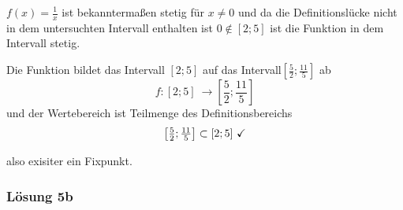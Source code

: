 \documentclass[main.tex]{subfiles}
\begin{document}
$f(x) =\frac{1}{x}$ ist bekanntermaßen stetig für $x\neq 0$ und da die Definitionslücke nicht in dem untersuchten Intervall enthalten ist $0\notin [ 2;5]$ ist die Funktion in dem Intervall stetig.

Die Funktion bildet das Intervall $\displaystyle {\textstyle [ 2;5]}$ auf das Intervall${\textstyle \left[\frac{5}{2} ;\frac{11}{5}\right]}$ ab 
\begin{equation*}
    {\textstyle f:[ 2;5] \ \rightarrow \left[\frac{5}{2} ;\frac{11}{5}\right]}
\end{equation*}
und der Wertebereich ist Teilmenge des Definitionsbereichs
\begin{equation*}
    {\textstyle \left[\frac{5}{2} ;\frac{11}{5}\right] \subset [ 2;5] \ \checkmark}
\end{equation*}

also exisiter ein Fixpunkt.

\subsubsection{Lösung 5b}
\end{document}
